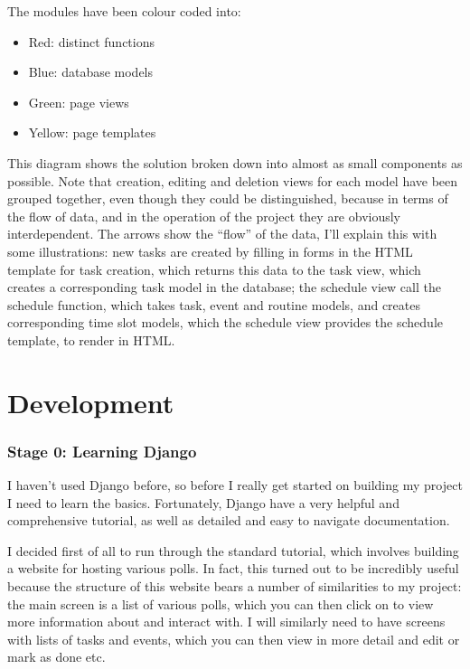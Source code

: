 \documentclass{article}
\begin{document}
The modules have been colour coded into:
\begin{samepage}
	\begin{itemize}
		\item Red: distinct functions
		\item Blue: database models
		\item Green: page views
		\item Yellow: page templates
	\end{itemize}
\end{samepage}

This diagram shows the solution broken down into almost as small components as possible.
Note that creation, editing and deletion views for each model have been grouped together,
even though they could be distinguished,
because in terms of the flow of data,
and in the operation of the project they are obviously interdependent.
The arrows show the ``flow'' of the data,
I'll explain this with some illustrations:
new tasks are created by filling in forms in the HTML template for task creation,
which returns this data to the task view,
which creates a corresponding task model in the database;
the schedule view call the schedule function,
which takes task, event and routine models,
and creates corresponding time slot models,
which the schedule view provides the schedule template,
to render in HTML.

\part{Development}
\section{Stage 0: Learning Django}
I haven't used Django before,
so before I really get started on building my project I need to learn the basics.
Fortunately, Django have a very helpful and comprehensive tutorial,
as well as detailed and easy to navigate documentation.

I decided first of all to run through the standard tutorial,
which involves building a website for hosting various polls.
In fact, this turned out to be incredibly useful because the structure of this website bears a number of similarities to my project:
the main screen is a list of various polls,
which you can then click on to view more information about and interact with.
I will similarly need to have screens with lists of tasks and events,
which you can then view in more detail and edit or mark as done etc.
\end{document}
